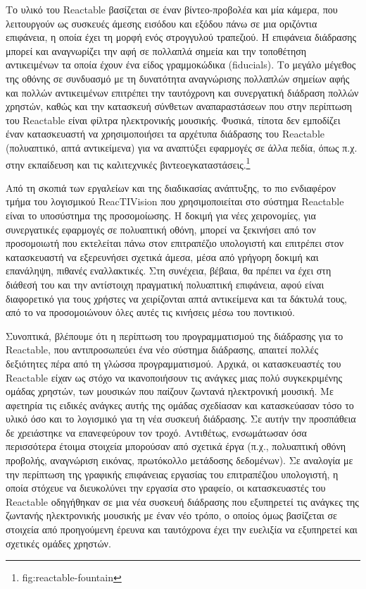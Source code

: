 \documentclass[
]{article}
\begin{document}
Το υλικό του Reactable βασίζεται σε έναν βίντεο-προβολέα και μία κάμερα,
που λειτουργούν ως συσκευές άμεσης εισόδου και εξόδου πάνω σε μια
οριζόντια επιφάνεια, η οποία έχει τη μορφή ενός στρογγυλού τραπεζιού. Η
επιφάνεια διάδρασης μπορεί και αναγνωρίζει την αφή σε πολλαπλά σημεία
και την τοποθέτηση αντικειμένων τα οποία έχουν ένα είδος γραμμοκώδικα
(fiducials). Το μεγάλο μέγεθος της οθόνης σε συνδυασμό με τη δυνατότητα
αναγνώρισης πολλαπλών σημείων αφής και πολλών αντικειμένων επιτρέπει την
ταυτόχρονη και συνεργατική διάδραση πολλών χρηστών, καθώς και την
κατασκευή σύνθετων αναπαραστάσεων που στην περίπτωση του Reactable είναι
φίλτρα ηλεκτρονικής μουσικής. Φυσικά, τίποτα δεν εμποδίζει έναν
κατασκευαστή να χρησιμοποιήσει τα αρχέτυπα διάδρασης του Reactable
(πολυαπτικό, απτά αντικείμενα) για να αναπτύξει εφαρμογές σε άλλα πεδία,
όπως π.χ. στην εκπαίδευση και τις καλιτεχνικές
βιντεοεγκαταστάσεις.\footnote{fig:reactable-fountain}

Από τη σκοπιά των εργαλείων και της διαδικασίας ανάπτυξης, το πιο
ενδιαφέρον τμήμα του λογισμικού ReacTIVision που χρησιμοποιείται στο
σύστημα Reactable είναι το υποσύστημα της προσομοίωσης. Η δοκιμή για
νέες χειρονομίες, για συνεργατικές εφαρμογές σε πολυαπτική οθόνη, μπορεί
να ξεκινήσει από τον προσομοιωτή που εκτελείται πάνω στον επιτραπέζιο
υπολογιστή και επιτρέπει στον κατασκευαστή να εξερευνήσει σχετικά άμεσα,
μέσα από γρήγορη δοκιμή και επανάληψη, πιθανές εναλλακτικές. Στη
συνέχεια, βέβαια, θα πρέπει να έχει στη διάθεσή του και την αντίστοιχη
πραγματική πολυαπτική επιφάνεια, αφού είναι διαφορετικό για τους χρήστες
να χειρίζονται απτά αντικείμενα και τα δάκτυλά τους, από το να
προσομοιώνουν όλες αυτές τις κινήσεις μέσω του ποντικιού.

Συνοπτικά, βλέπουμε ότι η περίπτωση του προγραμματισμού της διάδρασης
για το Reactable, που αντιπροσωπεύει ένα νέο σύστημα διάδρασης, απαιτεί
πολλές δεξιότητες πέρα από τη γλώσσα προγραμματισμού. Αρχικά, οι
κατασκευαστές του Reactable είχαν ως στόχο να ικανοποιήσουν τις ανάγκες
μιας πολύ συγκεκριμένης ομάδας χρηστών, των μουσικών που παίζουν ζωντανά
ηλεκτρονική μουσική. Με αφετηρία τις ειδικές ανάγκες αυτής της ομάδας
σχεδίασαν και κατασκεύασαν τόσο το υλικό όσο και το λογισμικό για τη νέα
συσκευή διάδρασης. Σε αυτήν την προσπάθεια δε χρειάστηκε να επανεφεύρουν
τον τροχό. Αντιθέτως, ενσωμάτωσαν όσα περισσότερα έτοιμα στοιχεία
μπορούσαν από σχετικά έργα (π.χ., πολυαπτική οθόνη προβολής, αναγνώριση
εικόνας, πρωτόκολλο μετάδοσης δεδομένων). Σε αναλογία με την περίπτωση
της γραφικής επιφάνειας εργασίας του επιτραπέζιου υπολογιστή, η οποία
στόχευε να διευκολύνει την εργασία στο γραφείο, οι κατασκευαστές του
Reactable οδηγήθηκαν σε μια νέα συσκευή διάδρασης που εξυπηρετεί τις
ανάγκες της ζωντανής ηλεκτρονικής μουσικής με έναν νέο τρόπο, ο οποίος
όμως βασίζεται σε στοιχεία από προηγούμενη έρευνα και ταυτόχρονα έχει
την ευελιξία να εξυπηρετεί και σχετικές ομάδες χρηστών.
\end{document}
